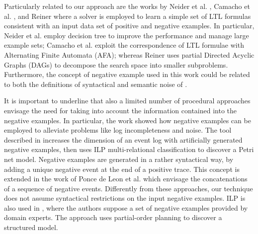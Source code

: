 Particularly related to our approach are the works by Neider et al. \cite{2018-Neider}, Camacho et al. \cite{2019-Camacho}, and Reiner \cite{2019-Riener} where a solver is employed to learn a simple set of LTL formulas consistent with an input data set of positive and negative examples. In particular, Neider et al. \cite{2018-Neider} employ decision tree to improve the performance and manage large example sets; Camacho et al. \cite{2019-Camacho} exploit the correspondence of LTL formulae with Alternating Finite Automata (AFA); whereas Reiner \cite{2019-Riener} uses partial Directed Acyclic Graphs (DAGs) to decompose the search space into smaller subproblems.
Furthermore, the concept of negative example used in this work could be related to both the definitions of syntactical and semantic noise of \cite{2009-Gunther}. %
 
It is important to underline that also a limited number of procedural approaches envisage the need for taking into account the information contained into the negative examples. 
In particular, the work \cite{2015-Ponce} showed how negative examples can be employed to alleviate problems like log incompleteness and noise.
The tool described in \cite{2009-Goedertier} increases the dimension of an event log with artificially generated negative examples, then uses \ac{ILP} multi-relational classification to discover a Petri net model. 
Negative examples are generated in a rather syntactical way, by adding a unique negative event at the end of a positive trace. This concept is extended in the work of Ponce de Leon et al. \cite{2018-Ponce} which envisage the concatenations of a sequence of negative events. Differently from these approaches, our technique does not assume syntactical restrictions on the input negative examples.
%
\ac{ILP} is also used in \cite{2006-Ferreira}, where the authors suppose a set of negative examples provided by domain experts. The approach uses partial-order planning to discover a structured model. %
 
